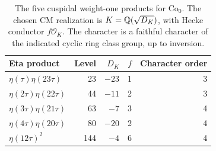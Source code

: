 \begin{table}[htbp]
\centering
\caption{The five cuspidal weight-one products for \(\mathrm{Co}_0\).
The chosen CM realization is \(K=\mathbb Q(\sqrt{D_K})\), with
Hecke conductor \(f\mathcal O_K\).
The character is a faithful character of the indicated cyclic ring class
group, up to inversion.}
\label{tab:weight-one-cusp}
\begin{tabular}{@{}lrrrr@{}}
\toprule
Eta product&Level&\(D_K\)&\(f\)&Character order\\\midrule
\(\eta(\tau)\eta(23\tau)\)&23&\(-23\)&1&3\\
\(\eta(2\tau)\eta(22\tau)\)&44&\(-11\)&2&3\\
\(\eta(3\tau)\eta(21\tau)\)&63&\(-7\)&3&4\\
\(\eta(4\tau)\eta(20\tau)\)&80&\(-20\)&2&4\\
\(\eta(12\tau)^2\)&144&\(-4\)&6&4\\
\bottomrule
\end{tabular}
\end{table}

{\small

}


